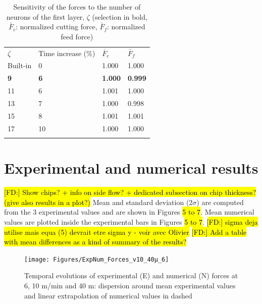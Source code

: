 \documentclass[preprint,12pt,times]{elsarticle}
\DeclareRobustCommand{\FD}[1]{ {\begingroup\sethlcolor{VWgreen}\textcolor{black}{\hl{[FD:] #1}}\endgroup} }
\begin{document}
%
\begin{table}[!h]
\begin{center}
\caption{\label{tab:NbNeurons} Sensitivity of the forces to the number of neurons of the first layer, $\zeta$
(selection in bold, $\check{F_c}$: normalized cutting force, $\check{F_f}$: normalized feed force)}
\begin{tabular}{llll}
\hline\noalign{\smallskip}
$\zeta$  & Time increase (\%) & $\check{F_c}$ & $\check{F_f}$\\
\noalign{\smallskip}\hline\noalign{\smallskip}
Built-in & 0 & 1.000 & 1.000\\
\textbf{9} & \textbf{6} & \textbf{1.000} & \textbf{0.999}\\
11 & 6 & 1.001 & 1.000\\
13 & 7 & 1.000 & 0.998\\
15 & 8 & 1.001 & 1.001\\
17 & 10 & 1.000 & 1.000\\
\noalign{\smallskip}\hline
\end{tabular}
\end{center}
\end{table}
%

\section{Experimental and numerical results\label{sec:ExpNumResults}}
\label{Results}
\FD{Show chips? + info on side flow? + dedicated subsection on chip thickness? (give also results in a plot?)}
Mean and standard deviation ($2\sigma$) are computed from the 3 experimental values and are shown in Figures \hl{5 to 7}. Mean numerical values are plotted inside the experimental bars in Figures \hl{5 to 7}.
\FD{sigma deja utilise mais equa (5) devrait etre sigma y - voir avec Olivier}
\FD{Add a table with mean differences as a kind of summary of the results?}

\begin{figure}[h]
\centering
\texttt{[image: Figures/ExpNum\_Forces\_v10\_40µ\_6]}
\caption{Temporal evolutions of experimental (E) and numerical (N) forces at 6\textdegree{}, 10 m/min and 40 \textmu{}m: dispersion around mean experimental values and linear extrapolation of numerical values in dashed}
\label{ExpNum_Forces_v10_40µ_6}
\end{figure}
\end{document}
